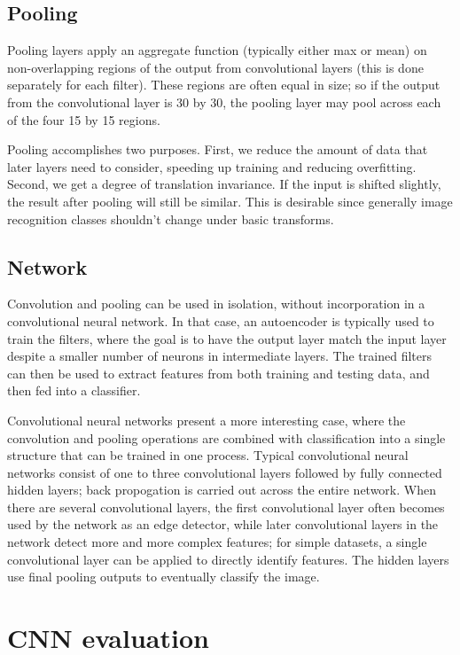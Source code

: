 \documentclass[10pt,twocolumn]{article}
\begin{document}
\subsection{Pooling}

Pooling layers apply an aggregate function (typically either max or mean) on non-overlapping regions of the output from convolutional layers (this is done separately for each filter). These regions are often equal in size; so if the output from the convolutional layer is 30 by 30, the pooling layer may pool across each of the four 15 by 15 regions.

Pooling accomplishes two purposes. First, we reduce the amount of data that later layers need to consider, speeding up training and reducing overfitting. Second, we get a degree of translation invariance. If the input is shifted slightly, the result after pooling will still be similar. This is desirable since generally image recognition classes shouldn't change under basic transforms.

\subsection{Network}

Convolution and pooling can be used in isolation, without incorporation in a convolutional neural network. In that case, an autoencoder is typically used to train the filters, where the goal is to have the output layer match the input layer despite a smaller number of neurons in intermediate layers. The trained filters can then be used to extract features from both training and testing data, and then fed into a classifier.

Convolutional neural networks present a more interesting case, where the convolution and pooling operations are combined with classification into a single structure that can be trained in one process. Typical convolutional neural networks consist of one to three convolutional layers followed by fully connected hidden layers; back propogation is carried out across the entire network. When there are several convolutional layers, the first convolutional layer often becomes used by the network as an edge detector, while later convolutional layers in the network detect more and more complex features; for simple datasets, a single convolutional layer can be applied to directly identify features. The hidden layers use final pooling outputs to eventually classify the image.

\section{CNN evaluation} \label{sec:evalcnn}
\end{document}
